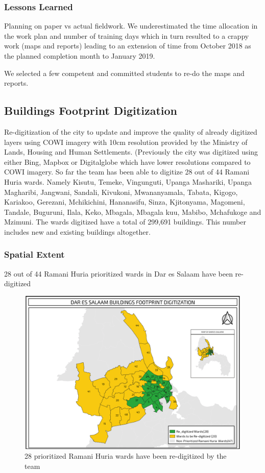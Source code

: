 \documentclass[a4paper,12pt,twoside]{article}
\begin{document}
\subsubsection{Lessons Learned}
Planning on paper vs actual fieldwork. We underestimated the time allocation in the work plan and number of training days which in turn resulted to a crappy work (maps and reports) leading to an  extension of time from October 2018 as the planned completion month to January 2019.

\medskip
We selected a few competent and committed students to re-do the maps and reports.


\newpage
\subsection{Buildings Footprint Digitization}
\begin{multicols}{2}
Re-digitization of the city to update and improve the quality of already digitized layers using COWI imagery with 10cm resolution provided by the Ministry of Lands, Housing and Human Settlements. (Previously the city was digitized using either Bing, Mapbox or Digitalglobe which have lower resolutions compared to COWI imagery. So far the team has been able to digitize 28 out of 44 Ramani Huria wards. Namely Kisutu, Temeke, Vingunguti, Upanga Mashariki, Upanga Magharibi, Jangwani, Sandali, Kivukoni, Mwananyamala, Tabata, Kigogo, Kariakoo, Gerezani, Mchikichini, Hananasifu, Sinza, Kjitonyama, Magomeni, Tandale, Buguruni, Ilala, Keko, Mbagala, Mbagala kuu, Mabibo, Mchafukoge and Mzimuni. The wards digitized have a total of 299,691 buildings. This number includes new and existing buildings altogether.
\end{multicols}

\subsubsection{Spatial Extent}
28 out of 44 Ramani Huria prioritized wards in Dar es Salaam have been re-digitized
\begin{figure}[h]
  \caption{28 prioritized Ramani Huria wards have been re-digitized by the team}
  \centering
  \includegraphics[width=1\textwidth]{images/Building_Footprint_Digitization.png}
\end{figure}
\end{document}
